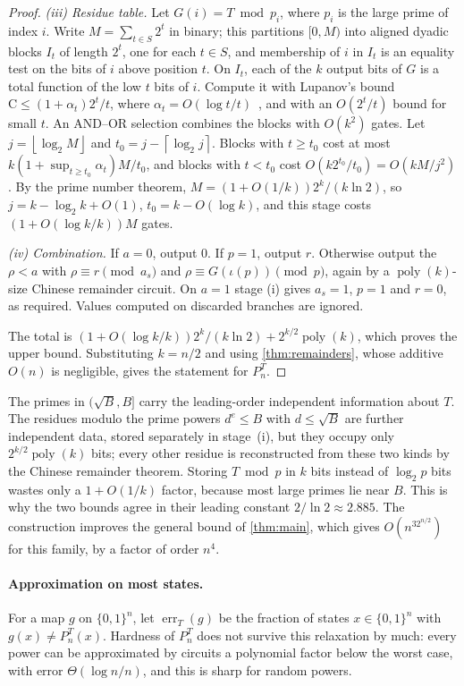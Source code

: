 \documentclass[11pt]{article}
\theoremstyle{definition}
\theoremstyle{remark}
\newcommand{\bits}{\{0,1\}}
\newcommand{\CC}{\mathrm{C}}
\newcommand{\poly}{\operatorname{poly}}
\newcommand{\floor}[1]{\left\lfloor #1\right\rfloor}
\newcommand{\ceil}[1]{\left\lceil #1\right\rceil}
\numberwithin{equation}{section}
\begin{document}
\begin{proof}
\emph{(iii) Residue table.}  Let $G(i)=T\bmod p_i$, where $p_i$ is the
large prime of index $i$.  Write $M=\sum_{t\in S}2^t$ in binary; this
partitions $[0,M)$ into aligned dyadic blocks $I_t$ of length $2^t$, one
for each $t\in S$, and membership of $i$ in $I_t$ is an equality test on
the bits of $i$ above position $t$.  On $I_t$, each of the $k$ output bits
of $G$ is a total function of the low $t$ bits of $i$.  Compute it with
Lupanov's bound $\CC\leq(1+\alpha_t)2^t/t$, where
$\alpha_t=O(\log t/t)$~\cite{Lupanov58,Jukna12}, and with an $O(2^t/t)$
bound for small $t$.  An AND--OR selection combines the blocks with
$O(k^2)$ gates.  Let $j=\floor{\log_2M}$ and $t_0=j-\ceil{\log_2 j}$.
Blocks with $t\geq t_0$ cost at most
$k(1+\sup_{t\geq t_0}\alpha_t)M/t_0$, and blocks with $t<t_0$ cost
$O(k2^{t_0}/t_0)=O(kM/j^2)$.  By the prime number theorem,
$M=(1+O(1/k))2^k/(k\ln2)$, so $j=k-\log_2k+O(1)$,
$t_0=k-O(\log k)$, and this stage costs $(1+O(\log k/k))M$ gates.

\emph{(iv) Combination.}  If $a=0$, output $0$.  If $p=1$, output $r$.
Otherwise output the $\rho<a$ with $\rho\equiv r\pmod{a_s}$ and
$\rho\equiv G(\iota(p))\pmod p$, again by a $\poly(k)$-size
Chinese remainder circuit.  On $a=1$ stage (i) gives $a_s=1$, $p=1$ and
$r=0$, as required.  Values computed on discarded branches are ignored.

The total is $(1+O(\log k/k))2^k/(k\ln2)+2^{k/2}\poly(k)$, which proves
the upper bound.  Substituting $k=n/2$ and using \cref{thm:remainders},
whose additive $O(n)$ is negligible, gives the statement for $P_n^T$.
\end{proof}

The primes in $(\sqrt B,B]$ carry the leading-order independent
information about $T$.  The residues modulo the prime powers $d^e\leq B$
with $d\leq\sqrt B$ are further independent data, stored separately in
stage~(i), but they occupy only $2^{k/2}\poly(k)$ bits; every other
residue is reconstructed from these two kinds by the Chinese remainder
theorem.  Storing $T\bmod p$ in $k$ bits instead of $\log_2p$ bits wastes
only a $1+O(1/k)$ factor, because most large primes lie near $B$.  This is
why the two bounds agree in their leading constant
$2/\ln2\approx2.885$.  The construction improves the general bound of
\cref{thm:main}, which gives $O(n^32^{n/2})$ for this family, by a
factor of order $n^4$.

\paragraph{Approximation on most states.}
For a map $g$ on $\bits^n$, let $\operatorname{err}_T(g)$ be the fraction of
states $x\in\bits^n$ with $g(x)\neq P_n^T(x)$.  Hardness of $P_n^T$
does not survive this relaxation by much: every power can be approximated
by circuits a polynomial factor below the worst case, with error
$\Theta(\log n/n)$, and this is sharp for random powers.
\end{document}
